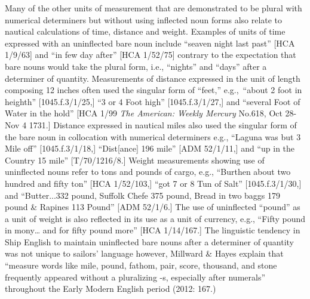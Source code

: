   Many of the other units of measurement that are demonstrated to be plural with numerical determiners but without using inflected noun forms also relate to nautical calculations of time, distance and weight. Examples of units of time expressed with an uninflected bare noun include “seaven night last past” [HCA 1/9/63] and “in few day after” [HCA 1/52/75] contrary to the expectation that bare nouns would take the plural form, i.e., “nights” and “days” after a determiner of quantity. Measurements of distance expressed in the unit of length composing 12 inches often used the singular form of “feet,” e.g.,~“about 2 foot in heighth” [1045.f.3/1/25,] “3 or 4 Foot high” [1045.f.3/1/27,] and “several Foot of Water in the hold” [HCA 1/99 \textit{The American: Weekly Mercury} No.618, Oct 28-Nov 4 1731.] Distance expressed in nautical miles also used the singular form of the bare noun in collocation with numerical determiners e.g., “Laguna was but 3 Mile off” [1045.f.3/1/18,] “Dist[ance] 196 mile” [ADM 52/1/11,] and “up in the Country 15 mile” [T/70/1216/8.] Weight measurements showing use of uninflected nouns refer to tons and pounds of cargo, e.g., “Burthen about two hundred and fifty ton” [HCA 1/52/103,] “got 7 or 8 Tun of Salt” [1045.f.3/1/30,] and “Butter...332 pound, Suffolk Chefe 375 pound, Bread in two baggs 179 pound \& Rapines 113 Pound” [ADM 52/1/6.] The use of uninflected “pound” as a unit of weight is also reflected in its use as a unit of currency, e.g., “Fifty pound in mony… and for fifty pound more” [HCA 1/14/167.] The linguistic tendency in Ship English to maintain uninflected bare nouns after a determiner of quantity was not unique to sailors’ language however, Millward \& Hayes explain that “measure words like mile, pound, fathom, pair, score, thousand, and stone frequently appeared without a pluralizing -s, especially after numerals” throughout the Early Modern English period (2012: 167.)


